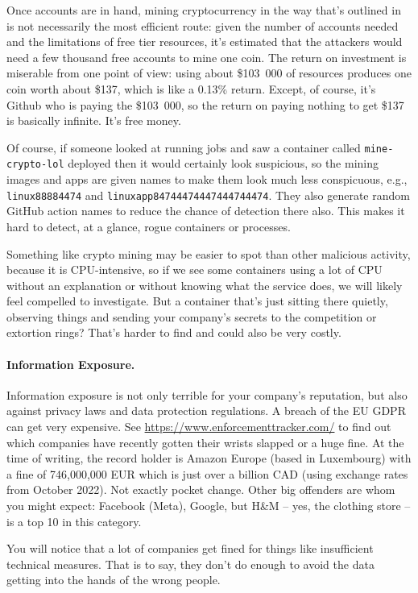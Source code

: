 Once accounts are in hand, mining cryptocurrency in the way that's outlined in~\cite{sysdig} is not necessarily the most efficient route: given the number of accounts needed and the limitations of free tier resources, it's estimated that the attackers would need a few thousand free accounts to mine one coin. The return on investment is miserable from one point of view: using about \$103~000 of resources produces one coin worth about \$137, which is like a 0.13\% return. Except, of course, it's Github who is paying the \$103~000, so the return on paying nothing to get \$137 is basically infinite. It's free money.

Of course, if someone looked at running jobs and saw a container called \texttt{mine-crypto-lol} deployed then it would certainly look suspicious, so the mining images and apps are given names to make them look much less conspicuous, e.g., \texttt{linux88884474} and \texttt{linuxapp84744474447444744474}. They also generate random GitHub action names to reduce the chance of detection there also. This makes it hard to detect, at a glance, rogue containers or processes. 

Something like crypto mining may be easier to spot than other malicious activity, because it is CPU-intensive, so if we see some containers using a lot of CPU without an explanation or without knowing what the service does, we will likely feel compelled to investigate. But a container that's just sitting there quietly, observing things and sending your company's secrets to the competition or extortion rings? That's harder to find and could also be very costly.

\paragraph{Information Exposure.}
Information exposure is not only terrible for your company's reputation, but also against privacy laws and data protection regulations. A breach of the EU GDPR can get very expensive. See \url{https://www.enforcementtracker.com/} to find out which companies have recently gotten their wrists slapped or a huge fine. At the time of writing, the record holder is Amazon Europe (based in Luxembourg) with a fine of 	746,000,000 EUR which is just over a billion CAD (using exchange rates from October 2022). Not exactly pocket change. Other big offenders are whom you might expect: Facebook (Meta), Google, but H\&M -- yes, the clothing store -- is a top 10 in this category.

You will notice that a lot of companies get fined for things like insufficient technical measures. That is to say, they don't do enough to avoid the data getting into the hands of the wrong people.

